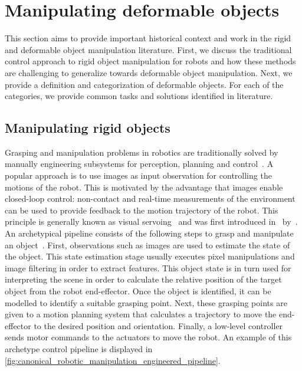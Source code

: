 \section{Manipulating deformable objects} \label{sec:lit_traditional}

This section aims to provide important historical context and work in the rigid and deformable object manipulation literature. First, we discuss the traditional control approach to rigid object manipulation for robots and how these methods are challenging to generalize towards deformable object manipulation. Next, we provide a definition and categorization of deformable objects. For each of the categories, we provide common tasks and solutions identified in literature.

\subsection{Manipulating rigid objects}
Grasping and manipulation problems in robotics are traditionally solved by manually engineering subsystems for perception, planning and control~\autocite{Siciliano2008}. A popular approach is to use images as input observation for controlling the motions of the robot. This is motivated by the advantage that images enable closed-loop control: non-contact and real-time measurements of the environment can be used to provide feedback to the motion trajectory of the robot. This principle is generally known as visual servoing~\autocite{Hutchinson1996} and was first introduced in~\citeyear{Hill1979} by~\textcite{Hill1979}. An archetypical pipeline consists of the following steps to grasp and manipulate an object~\autocite{Corke1996}. First, observations such as images are used to estimate the state of the object. This state estimation stage usually executes pixel manipulations and image filtering in order to extract features. This object state is in turn used for interpreting the scene in order to calculate the relative position of the target object from the robot end-effector. Once the object is identified, it can be modelled to identify a suitable grasping point. Next, these grasping points are given to a motion planning system that calculates a trajectory to move the end-effector to the desired position and orientation. Finally, a low-level controller sends motor commands to the actuators to move the robot. An example of this archetype control pipeline is displayed in \cref{fig:canonical_robotic_manipulation_engineered_pipeline}.

